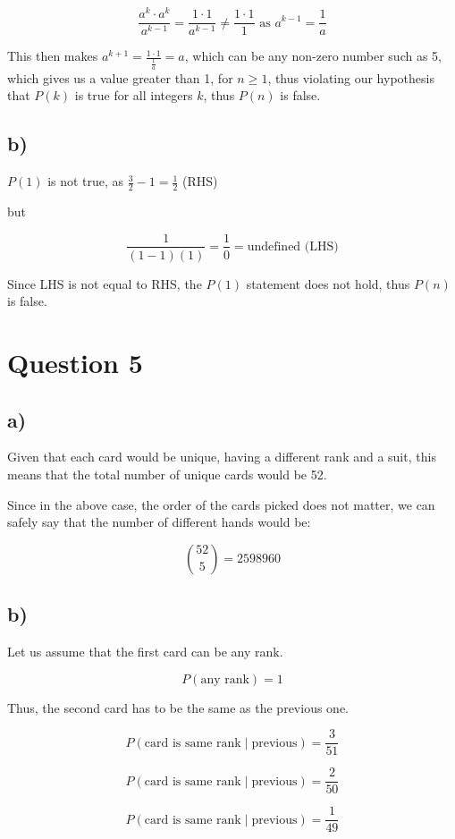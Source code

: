 \documentclass[11pt,fleqn]{article}
\theoremstyle{definition}
\theoremstyle{remark}
\begin{document}
\[
\frac{a^k \cdot a^k}{a^{k-1}} = \frac{1 \cdot 1}{a^{k-1}} \neq \frac{1 \cdot 1}{1} \text{ as } a^{k-1} = \frac{1}{a}
\]

This then makes \(a^{k+1} = \frac{1 \cdot 1}{\frac{1}{a}} = a\), which can be any non-zero number such as 5, which gives us a value greater than 1, for \(n \geq 1\), thus violating our hypothesis that \(P(k)\) is true for all integers \(k\), thus \(P(n)\) is false.

\subsection*{b)}
\(P(1)\) is not true, as \(\frac{3}{2} - 1 = \frac{1}{2}\) (RHS)

but 

\[
\frac{1}{(1-1)(1)} = \frac{1}{0} = \text{undefined} \text{ (LHS)}
\]

Since LHS is not equal to RHS, the \(P(1)\) statement does not hold, thus \(P(n)\) is false.

\section*{Question 5}

\subsection*{a)}
Given that each card would be unique, having a different rank and a suit, this means that the total number of unique cards would be 52.

Since in the above case, the order of the cards picked does not matter, we can safely say that the number of different hands would be:

\[
\binom{52}{5} = 2598960
\]

\subsection*{b)}
Let us assume that the first card can be any rank.

\[
P(\text{any rank}) = 1
\]

Thus, the second card has to be the same as the previous one.

\[
P(\text{card is same rank} \mid \text{previous}) = \frac{3}{51}
\]

\[
P(\text{card is same rank} \mid \text{previous}) = \frac{2}{50}
\]

\[
P(\text{card is same rank} \mid \text{previous}) = \frac{1}{49}
\]
\end{document}
